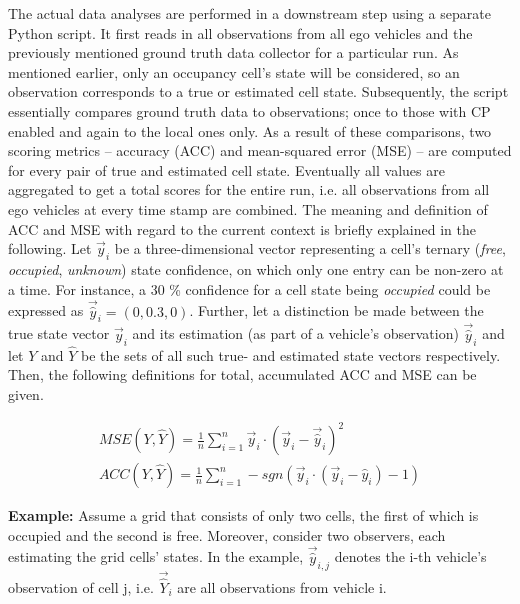 The actual data analyses are performed in a downstream step using a separate Python script. It first reads in all observations from all ego vehicles and the previously mentioned ground truth data collector for a particular run. As mentioned earlier, only an occupancy cell's state will be considered, so an observation corresponds to a true or estimated cell state. Subsequently, the script essentially compares ground truth data to observations; once to those with CP enabled and again to the local ones only. As a result of these comparisons, two scoring metrics – accuracy (ACC) and mean-squared error (MSE) – are computed for every pair of true and estimated cell state. Eventually all values are aggregated to get a total scores for the entire run, i.e. all observations from all ego vehicles at every time stamp are combined. The meaning and definition of ACC and MSE with regard to the current context is briefly explained in the following.
Let $\vec{y}_i$ be a three-dimensional vector representing a cell's ternary (\textit{free}, \textit{occupied}, \textit{unknown}) state confidence, on which only one entry can be non-zero at a time. For instance, a 30 \% confidence for a cell state being \textit{occupied} could be expressed as $\vec{\hat{y}}_i = (0, 0.3, 0)$. Further, let a distinction be made between the true state vector $\vec{y}_i$ and its estimation (as part of a vehicle's observation) $\vec{\hat{y}}_i$ and let $Y$ and $\hat{Y}$ be the sets of all such true- and estimated state vectors respectively. Then, the following definitions for total, accumulated ACC and MSE can be given.

\begin{gather}
	\textit{MSE}(Y, \hat{Y}) = \frac{1}{n} \sum_{i=1}^{n} \vec{y}_i \cdot (\vec{y}_i - \vec{\hat{y}}_i)^2 \\
	\textit{ACC}(Y, \hat{Y}) = \frac{1}{n} \sum_{i=1}^{n} -\textit{sgn}(\vec{y}_i \cdot (\vec{y}_i - \hat{y}_i) - 1)
\end{gather}

\textbf{Example:} Assume a grid that consists of only two cells, the first of which is occupied and the second is free. Moreover, consider two observers, each estimating the grid cells' states. In the example, $\vec{\hat{y}}_{i,j}$ denotes the i-th vehicle's observation of cell j, i.e. $\vec{\hat{Y}}_i$ are all observations from vehicle i.

